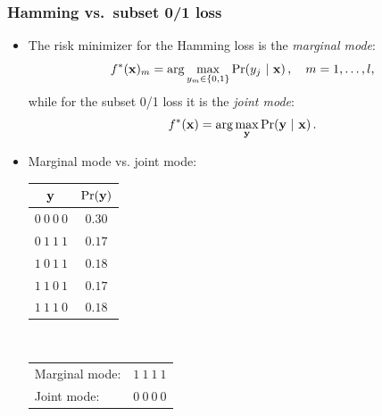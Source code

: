 \documentclass[11pt,compress,t,notes=noshow, xcolor=table]{beamer}
\begin{document}
\begin{frame}
	\frametitle{Hamming vs.\ subset 0/1 loss}
	\begin{itemize}
		\item The risk minimizer for the Hamming loss is the  \emph{marginal mode}:
		$$
		f^*(\mathbf{x})_m = \arg \max_{y_m \in \{0,1\}} \Pr( y_j  ~|~ \mathbf{x} )\,, \quad m = 1,\ldots,l,
		$$
		while for the subset 0/1 loss it is the \emph{joint mode}:
		$$
		f^*(\mathbf{x}) = \arg \max_{\mathbf{y}} \Pr(\mathbf{y} ~|~ \mathbf{x}) \,.
		$$
		\item Marginal mode vs. joint mode:\\[6pt]
		\begin{center}
			\begin{tabular}{@{}cc@{}}
				\toprule
				$\mathbf{y}$ & $\Pr(\mathbf{y})$ \\
				\hline
				$0~0~0~0$ & $0.30$ \\
				$0~1~1~1$ & $0.17$ \\
				$1~0~1~1$ & $0.18$ \\
				$1~1~0~1$ & $0.17$ \\
				$1~1~1~0$ & $0.18$ \\
				\toprule
			\end{tabular}
			$\qquad$
			\footnotesize{
				\begin{tabular}{lr}
					Marginal mode: & $1~1~1~1$ \\
					Joint mode: & $0~0~0~0$ \\
				\end{tabular}
			}
		\end{center}
	\end{itemize}
\end{frame}
\end{document}

